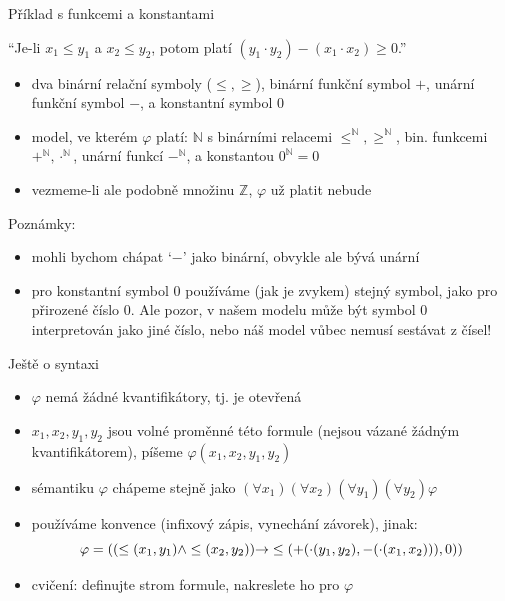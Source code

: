 \documentclass{beamer}
\begin{document}
\begin{frame}{Příklad s funkcemi a konstantami}

    ``Je-li $x_1\leq y_1$ a $x_2\leq y_2$, potom platí $(y_1 \cdot y_2)-(x_1\cdot x_2)\geq 0$.''\pause

    \pause

    \begin{itemize}
        \item dva binární relační symboly ($\leq,\geq$), binární funkční symbol $+$, unární funkční symbol $-$, a konstantní symbol $0$\pause
        \item \alert{model, ve kterém $\varphi$ platí:} $\mathbb N$ s binárními relacemi $\leq^\mathbb N,\geq^\mathbb N$, bin. funkcemi $+^\mathbb N,\cdot^\mathbb N$, unární funkcí $-^\mathbb N$, a konstantou $0^\mathbb N=0$ \pause
        \item vezmeme-li ale podobně množinu $\mathbb Z$, $\varphi$ už platit nebude\pause
    \end{itemize}
    Poznámky:\pause
    \begin{itemize}
        \item mohli bychom chápat `$-$' jako binární, obvykle ale bývá unární\pause
        \item pro \alert{konstantní symbol} $0$ používáme (jak je zvykem) stejný symbol, jako pro přirozené číslo 0. \pause Ale pozor, v našem modelu může být \alert{symbol} $0$ interpretován jako \alert{jiné číslo}, nebo náš model vůbec nemusí sestávat z čísel!
    \end{itemize}

\end{frame}


\begin{frame}{Ještě o syntaxi}

    \pause

    \begin{itemize}
        \item $\varphi$ nemá žádné kvantifikátory, tj. je \alert{otevřená}\pause
        \item $x_1,x_2,y_1,y_2$ jsou \alert{volné proměnné} této formule (nejsou \alert{vázané} žádným kvantifikátorem), píšeme $\varphi(x_1,x_2,y_1,y_2)$\pause
        \item sémantiku $\varphi$ chápeme stejně jako $(\forall x_1)(\forall x_2)(\forall y_1)(\forall y_2)\varphi$\pause
        \item používáme \alert{konvence} (infixový zápis, vynechání závorek), jinak:
        $$
        \varphi=((\leq (x_1,y_1) \land \leq(x_2,y_2))\mathbin{\rightarrow} \leq(+(\cdot (y_1,y_2),-(\cdot(x_1,x_2))),0))
        $$\pause
        \item cvičení: definujte \alert{strom formule}, nakreslete ho pro $\varphi$
    \end{itemize}
   
\end{frame}
\end{document}
